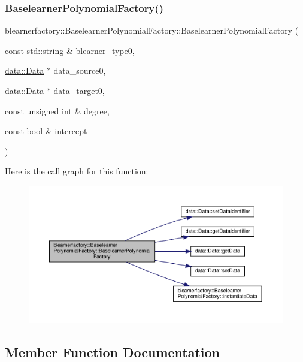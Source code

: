 \subsubsection{\texorpdfstring{Baselearner\+Polynomial\+Factory()}{BaselearnerPolynomialFactory()}}
{\footnotesize\ttfamily blearnerfactory\+::\+Baselearner\+Polynomial\+Factory\+::\+Baselearner\+Polynomial\+Factory (\begin{DoxyParamCaption}\item[{const std\+::string \&}]{blearner\+\_\+type0,  }\item[{\hyperlink{classdata_1_1_data}{data\+::\+Data} $\ast$}]{data\+\_\+source0,  }\item[{\hyperlink{classdata_1_1_data}{data\+::\+Data} $\ast$}]{data\+\_\+target0,  }\item[{const unsigned int \&}]{degree,  }\item[{const bool \&}]{intercept }\end{DoxyParamCaption})}

Here is the call graph for this function\+:
\nopagebreak
\begin{figure}[H]
\begin{center}
\leavevmode
\includegraphics[width=350pt]{classblearnerfactory_1_1_baselearner_polynomial_factory_aaa0dbb3dab4a98dfb1835998fc3ffa50_cgraph}
\end{center}
\end{figure}


\subsection{Member Function Documentation}
\mbox{\label{classblearnerfactory_1_1_baselearner_polynomial_factory_a18095806fa93e6ac2159e966ededc1cf}} 
